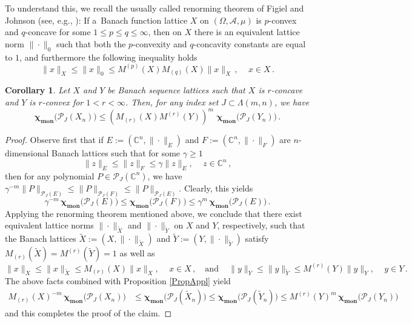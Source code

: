 \documentclass[12pt]{amsart}
\numberwithin{subsection}{section}
\newtheorem{corollary}[theorem]{Corollary}
\theoremstyle{definition}
\theoremstyle{remark}
\DeclareMathOperator{\mon}{mon}
\newcommand{\chimon}{\chi_{\mon}}
\begin{document}
To understand this, we recall  the usually called renorming theorem of Figiel and Johnson (see, e.g., \cite[Proposition~1.d.8]{LT}):
If a~Banach function lattice $X$ on $(\Omega, \mathcal{A}, \mu)$ is $p$-convex and $q$-concave for some $1\leq p\leq q\leq \infty$,
then on $X$ there is an equivalent lattice norm $\|\cdot\|_0$ such that both the $p$-convexity and $q$-concavity constants are
equal to $1$, and furthermore the following inequality holds
\[
\|x\|_X \leq \|x\|_0 \leq M^{(p)}(X)M_{(q)}(X) \|x\|_{X}\,, \quad\, x\in X\,.
\]


\begin{corollary} \label{appl}
Let $X$ and $Y$ be Banach sequence lattices such that  $X$ is $r$-concave and $Y$ is $r$-convex for $1 <r <\infty$. Then, for
any index set $J \subset \Lambda(m,n)$, we have
\[
\boldsymbol{\chimon}\big(\mathcal{P}_{J}(X_n)\big)
\le (M_{(r)}(X) M^{(r)}(Y))^m\,\,\boldsymbol{\chimon}\big(\mathcal{P}_{J}(Y_n)\big)\,.
\]
\end{corollary}


\begin{proof}
Observe first that if $E:= (\mathbb{C}^n, \|\cdot\|_E)$ and $F:=(\mathbb{C}^n, \|\cdot\|_F)$ are
$n$-dimensional Banach lattices such that for some $\gamma \geq 1$
\[
\|z\|_E \le \|z\|_F \leq \gamma \|z\|_E, \quad\, z\in \mathbb{C}^n\,,
\]
then for any polynomial $P\in \mathcal{P}_J(\mathbb{C}^n)$, we have
$\gamma^{-m} \|P\|_{\mathcal{P}_J(E)} \leq \|P\|_{\mathcal{P}_J(F)} \leq \|P\|_{\mathcal{P}_J(E)}$.
Clearly, this yields
\[
\gamma^{-m}\,\boldsymbol{\chimon}\big(\mathcal{P}_J(E)\big) \leq  \boldsymbol{\chimon}\big(\mathcal{P}_J(F)\big)
\leq \gamma^m\,\boldsymbol{\chimon} \big(\mathcal{P}_J(E)\big)\,.
\]
Applying the renorming theorem mentioned above, we conclude that there exist equivalent lattice norms
$\|\cdot\|_{\tilde X}$ and $\|\cdot\|_{\tilde Y}$ on $X$ and $Y$, respectively, such that the Banach lattices
$\widetilde{X}:= (X, \|\cdot\|_{\widetilde{X}})$ and $\widetilde{Y} := (Y, \|\cdot\|_{\widetilde{Y}})$ satisfy
$M_{(r)}(\widetilde{X}) = M^{(r)}(\widetilde{Y})=1$ as well as
\begin{equation*}
\|x\|_X \le \|x\|_{\widetilde{X}} \le M_{(r)}(X) \|x\|_X, \quad\, x\in X\,,\,\,\,\,\,\,
\text{and}\,\,\,\,\,\,\,
\|y\|_Y \leq \|y\|_{\widetilde{Y}} \le M^{(r)}(Y) \|y\|_Y, \quad\, y\in Y\,.
\end{equation*}
The above facts combined with Proposition \ref{PropAppl} yield
\begin{align*}
M_{(r)}(X)^{-m}\,\boldsymbol{\chimon}
\big(\mathcal{P}_J(X_n)\big) & \le  \boldsymbol{\chimon}\big(\mathcal{P}_J(\widetilde{X}_n)\big)
\le \boldsymbol{\chimon}\big(\mathcal{P}_J(\widetilde{Y}_n)\big)
\le M^{(r)}(Y)^{m}\,\boldsymbol{\chimon}\big (\mathcal{P}_J(Y_n)\big)
\end{align*}
and this completes the proof of the  claim.
\end{proof}
\end{document}
